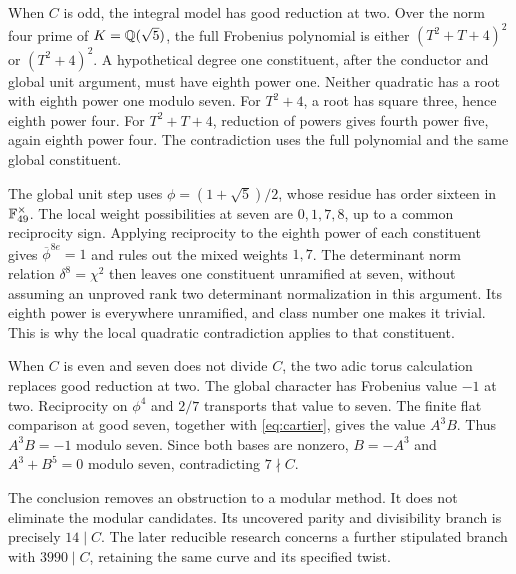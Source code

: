 When $C$ is odd, the integral model has good reduction at two. Over the norm four prime of $K=\mathbb Q(\sqrt5)$, the full Frobenius polynomial is either $(T^2+T+4)^2$ or $(T^2+4)^2$. A hypothetical degree one constituent, after the conductor and global unit argument, must have eighth power one. Neither quadratic has a root with eighth power one modulo seven. For $T^2+4$, a root has square three, hence eighth power four. For $T^2+T+4$, reduction of powers gives fourth power five, again eighth power four. The contradiction uses the full polynomial and the same global constituent.

The global unit step uses $\phi=(1+\sqrt5)/2$, whose residue has order sixteen in $\mathbb F_{49}^\times$. The local weight possibilities at seven are $0,1,7,8$, up to a common reciprocity sign. Applying reciprocity to the eighth power of each constituent gives $\overline\phi^{8e}=1$ and rules out the mixed weights $1,7$. The determinant norm relation $\delta^8=\chi^2$ then leaves one constituent unramified at seven, without assuming an unproved rank two determinant normalization in this argument. Its eighth power is everywhere unramified, and class number one makes it trivial. This is why the local quadratic contradiction applies to that constituent.

When $C$ is even and seven does not divide $C$, the two adic torus calculation replaces good reduction at two. The global character has Frobenius value $-1$ at two. Reciprocity on $\phi^4$ and $2/7$ transports that value to seven. The finite flat comparison at good seven, together with \eqref{eq:cartier}, gives the value $A^3B$. Thus $A^3B=-1$ modulo seven. Since both bases are nonzero, $B=-A^3$ and $A^3+B^5=0$ modulo seven, contradicting $7\nmid C$.

The conclusion removes an obstruction to a modular method. It does not eliminate the modular candidates. Its uncovered parity and divisibility branch is precisely $14\mid C$. The later reducible research concerns a further stipulated branch with $3990\mid C$, retaining the same curve and its specified twist.
